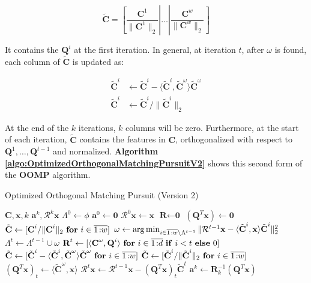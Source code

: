 \documentclass[12pt,a4paper,oneside,english]{UPBThesis}
\newcommand{\hcrange}[2]{\overline{{#1}\colon\!\!{#2}}}
\begin{document}
\begin{equation*}
\tilde{\textbf{C}} = \left[ \frac{\textbf{C}^1}{\|\textbf{C}^1\|_2} \left|\right. \dots \left|\right. \frac{\textbf{C}^w}{\|\textbf{C}^w\|_2} \right]
\end{equation*}

It contains the $\textbf{Q}^i$ at the first iteration. In general, at iteration $t$, after $\omega$ is found, each column of $\tilde{\textbf{C}}$ is updated as:

\begin{align*}
\tilde{\textbf{C}}^i & \gets \tilde{\textbf{C}}^i - \langle \tilde{\textbf{C}}^i, \tilde{\textbf{C}}^\omega \rangle \tilde{\textbf{C}}^\omega \\
\tilde{\textbf{C}}^i & \gets \tilde{\textbf{C}}^i / \| \tilde{\textbf{C}}^i \|_2
\end{align*}

At the end of the $k$ iterations, $k$ columns will be zero. Furthermore, at the start of each iteration, $\tilde{\textbf{C}}$ contains the features in $\textbf{C}$, orthogonalized with respect to $\textbf{Q}^1, \dots, \textbf{Q}^{t-1}$ and normalized. \textbf{Algorithm \ref{algo:OptimizedOrthogonalMatchingPursuitV2}} shows this second form of the \textbf{OOMP} algorithm.

\begin{algorithm}
\caption{Optimized Orthogonal Matching Pursuit (Version 2)}
\label{algo:OptimizedOrthogonalMatchingPursuitV2}
\begin{algorithmic}
\Require $\textbf{C},\textbf{x},k$
\Ensure $\textbf{a}^k,\mathcal{R}^k\textbf{x}$
\State $\Lambda^0 \gets \phi$
\State $\textbf{a}^0 \gets \textbf{0}$
\State $\mathcal{R}^0\textbf{x} \gets \textbf{x}$
\State $\textbf{R} \gets \textbf{0}$
\State $(\textbf{Q}^T\textbf{x}) \gets \textbf{0}$
\State $\tilde{\textbf{C}} \gets [ \textbf{C}^i / \|\textbf{C}^i\|_2 ~ \mbox{\textbf{for} $i \in \hcrange{1}{w}$} ]$
\For {$t = \hcrange{1}{k}$}
\State $\omega \gets \arg\min_{i \in \hcrange{1}{w} \setminus \Lambda^{t-1}} \| \mathcal{R}^{t-1}\textbf{x} - \langle \tilde{\textbf{C}}^i, \textbf x \rangle \tilde{\textbf{C}}^i \|_2^2$
\State $\Lambda^t \gets \Lambda^{t-1} \cup \omega$
\State $\textbf{R}^t \gets [ \langle \textbf{C}^\omega, \textbf{Q}^i \rangle~\mbox{\textbf{for} $i \in \hcrange{1}{d}$ \textbf{if} $i < t$ \textbf{else} $0$} ]$ 
\State $\tilde{\textbf{C}} \gets [ \tilde{\textbf{C}}^i - \langle \tilde{\textbf{C}}^i, \tilde{\textbf{C}}^\omega \rangle \tilde{\textbf{C}}^\omega ~ \mbox{\textbf{for} $i \in \hcrange{1}{w}$} ]$
\State $\tilde{\textbf{C}} \gets [ \tilde{\textbf{C}}^i / \| \tilde{\textbf{C}}^i \|_2 ~ \mbox{\textbf{for} $i \in \hcrange{1}{w}$} ]$
\State $(\textbf{Q}^T\textbf{x})_t \gets \langle \tilde{\textbf{C}}^\omega, \textbf{x} \rangle$
\State $\mathcal{R}^t\textbf{x} \gets \mathcal{R}^{t-1}\textbf{x} -  (\textbf{Q}^T\textbf{x})_t \tilde{\textbf{C}}^t$
\EndFor
\State $\textbf{a}^k \gets \textbf{R}_k^{-1}(\textbf{Q}^T\textbf{x})$
\end{algorithmic}
\end{algorithm}
\end{document}
